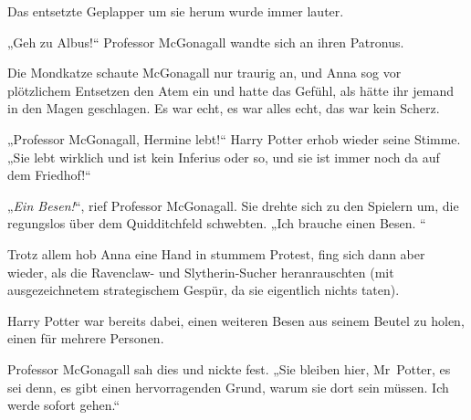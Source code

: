 Das entsetzte Geplapper um sie herum wurde immer lauter.

„Geh zu Albus!“
Professor McGonagall wandte sich an ihren Patronus.

Die Mondkatze schaute McGonagall nur traurig an, und Anna sog vor plötzlichem Entsetzen den Atem ein und hatte das Gefühl, als hätte ihr jemand in den Magen geschlagen. Es war echt, es war alles echt, das war kein Scherz.

„Professor McGonagall, Hermine lebt!“
Harry Potter erhob wieder seine Stimme.
„Sie lebt wirklich und ist kein Inferius oder so, und sie ist immer noch da auf dem Friedhof!“

„\emph{Ein Besen!}“, rief Professor McGonagall.
Sie drehte sich zu den Spielern um, die regungslos über dem Quidditchfeld schwebten.
„Ich brauche einen Besen. “

Trotz allem hob Anna eine Hand in stummem Protest, fing sich dann aber wieder, als die Ravenclaw- und Slytherin-Sucher heranrauschten (mit ausgezeichnetem strategischem Gespür, da sie eigentlich nichts taten).

Harry Potter war bereits dabei, einen weiteren Besen aus seinem Beutel zu holen, einen für mehrere Personen.

Professor McGonagall sah dies und nickte fest.
„Sie bleiben hier, Mr~Potter, es sei denn, es gibt einen hervorragenden Grund, warum sie dort sein müssen. Ich werde sofort gehen.“

